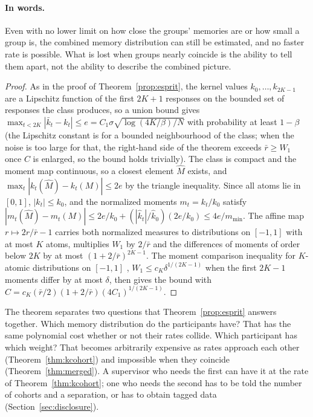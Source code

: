 \documentclass[12pt]{article}
\theoremstyle{definition}
\theoremstyle{remark}
\begin{document}
\paragraph{In words.} Even with no lower limit on how close the groups' memories are or how small a group is, the combined memory distribution can still be estimated, and no faster rate is possible. What is lost when groups nearly coincide is the ability to tell them apart, not the ability to describe the combined picture.

\begin{proof}
As in the proof of Theorem~\ref{prop:esprit}, the kernel values $k_0,\ldots,k_{2K-1}$ are a Lipschitz function of the first $2K+1$ responses on the bounded set of responses the class produces, so a union bound gives $\max_{t<2K}|\bar k_t-k_t|\le e=C_1\sigma\sqrt{\log(4K/\beta)/N}$ with probability at least $1-\beta$ (the Lipschitz constant is for a bounded neighbourhood of the class; when the noise is too large for that, the right-hand side of the theorem exceeds $\bar r\ge W_1$ once $C$ is enlarged, so the bound holds trivially). The class is compact and the moment map continuous, so a closest element $\hat M$ exists, and $\max_t|k_t(\hat M)-k_t(M)|\le2e$ by the triangle inequality. Since all atoms lie in $[0,1]$, $|k_t|\le k_0$, and the normalized moments $m_t=k_t/k_0$ satisfy $|m_t(\hat M)-m_t(M)|\le2e/k_0+(|\hat k_t|/\hat k_0)(2e/k_0)\le4e/m_{\min}$. The affine map $r\mapsto2r/\bar r-1$ carries both normalized measures to distributions on $[-1,1]$ with at most $K$ atoms, multiplies $W_1$ by $2/\bar r$ and the differences of moments of order below $2K$ by at most $(1+2/\bar r)^{2K-1}$. The moment comparison inequality for $K$-atomic distributions on $[-1,1]$ \citep{wu2020}, $W_1\le c_K\delta^{1/(2K-1)}$ when the first $2K-1$ moments differ by at most $\delta$, then gives the bound with $C=c_K(\bar r/2)(1+2/\bar r)(4C_1)^{1/(2K-1)}$.
\end{proof}

The theorem separates two questions that Theorem~\ref{prop:esprit} answers together. Which memory distribution do the participants have? That has the same polynomial cost whether or not their rates collide. Which participant has which weight? That becomes arbitrarily expensive as rates approach each other (Theorem~\ref{thm:kcohort}) and impossible when they coincide (Theorem~\ref{thm:merged}). A supervisor who needs the first can have it at the rate of Theorem~\ref{thm:kcohort}; one who needs the second has to be told the number of cohorts and a separation, or has to obtain tagged data (Section~\ref{sec:disclosure}).
\end{document}
